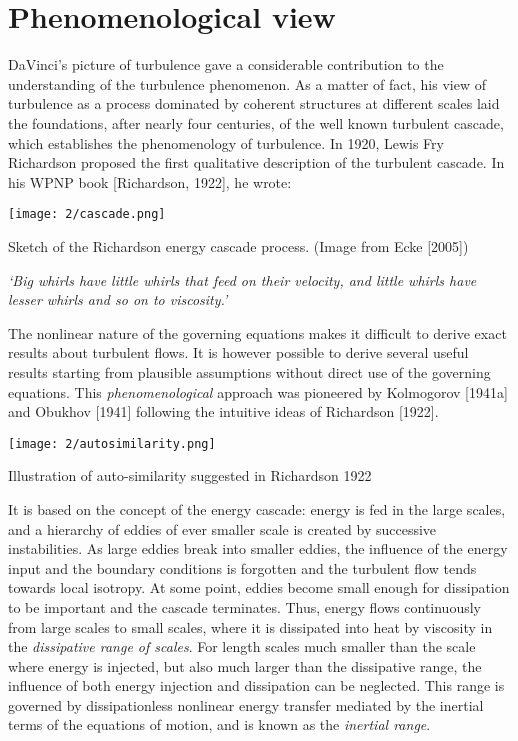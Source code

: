 \section{Phenomenological view}
DaVinci’s picture of turbulence gave a considerable contribution to the
understanding of the turbulence phenomenon. As a matter of fact, his view
of turbulence as a process dominated by coherent structures at different scales
laid the foundations, after nearly four centuries, of the well known turbulent
cascade, which establishes the phenomenology of turbulence. 
In 1920, Lewis Fry Richardson proposed the first qualitative description of the turbulent cascade. In his WPNP book [Richardson, 1922], he wrote:
\begin{marginfigure}
\texttt{[image: 2/cascade.png]}
\caption{Sketch of the Richardson energy cascade process. (Image from Ecke [2005])}
\end{marginfigure}
\begin{center}\begin{minipage}{.8\linewidth}
\emph{‘Big whirls have little whirls that feed on their velocity,
and little whirls have lesser whirls and so on to viscosity.’}
\end{minipage}\end{center}
The nonlinear nature of the governing equations makes it difficult to derive exact results about turbulent flows. It is however possible to derive several useful results starting from plausible assumptions without direct use of the governing equations. This \emph{phenomenological} approach was  pioneered by Kolmogorov [1941a] and Obukhov [1941] following the intuitive ideas of Richardson [1922].
\begin{marginfigure}
\texttt{[image: 2/autosimilarity.png]}
\caption{Illustration of auto-similarity suggested in Richardson 1922}
\end{marginfigure}
It is based on the concept of the energy cascade: energy is fed in the large scales, and a hierarchy of eddies of ever smaller scale is created by successive instabilities. As large eddies break into smaller eddies, the influence of the energy input and the boundary conditions is forgotten and the turbulent flow tends towards local isotropy. At some point, eddies become small enough for dissipation to be important and the cascade terminates. Thus, energy flows continuously from large scales to small scales, where it is dissipated into heat by viscosity in the \emph{dissipative range of scales}. For length scales much smaller than the scale where energy is injected, but also much larger than the dissipative range, the influence of both energy injection and dissipation can be neglected. This range is governed by dissipationless nonlinear energy transfer mediated by the inertial terms of the equations of motion, and is known as the \emph{inertial range}. 

